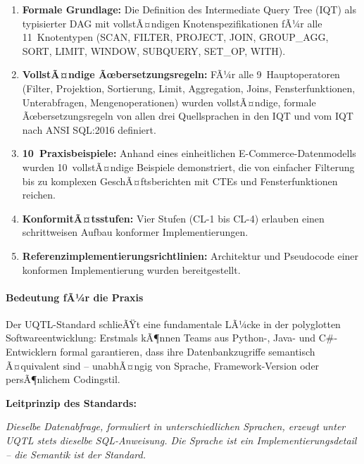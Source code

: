 \begin{enumerate}[leftmargin=1.5cm]
  \item \textbf{Formale Grundlage:} Die Definition des Intermediate Query Tree
    (IQT) als typisierter DAG mit vollstÃ¤ndigen Knotenspezifikationen fÃ¼r alle
    11~Knotentypen (SCAN, FILTER, PROJECT, JOIN, GROUP\_AGG, SORT, LIMIT,
    WINDOW, SUBQUERY, SET\_OP, WITH).

  \item \textbf{VollstÃ¤ndige Ãœbersetzungsregeln:} FÃ¼r alle 9~Hauptoperatoren
    (Filter, Projektion, Sortierung, Limit, Aggregation, Joins, Fensterfunktionen,
    Unterabfragen, Mengenoperationen) wurden vollstÃ¤ndige, formale
    Ãœbersetzungsregeln von allen drei Quellsprachen in den IQT und vom IQT
    nach ANSI SQL:2016 definiert.

  \item \textbf{10~Praxisbeispiele:} Anhand eines einheitlichen E-Commerce-Daten\-modells
    wurden 10~vollstÃ¤ndige Beispiele demonstriert, die von einfacher Filterung bis
    zu komplexen GeschÃ¤ftsberichten mit CTEs und Fensterfunktionen reichen.

  \item \textbf{KonformitÃ¤tsstufen:} Vier Stufen (CL-1 bis CL-4) erlauben
    einen schrittweisen Aufbau konformer Implementierungen.

  \item \textbf{Referenzimplementierungsrichtlinien:} Architektur und
    Pseudocode einer konformen Implementierung wurden bereitgestellt.
\end{enumerate}

\paragraph{Bedeutung fÃ¼r die Praxis}

Der UQTL-Standard schlieÃŸt eine fundamentale LÃ¼cke in der polyglotten
Softwareentwicklung: Erstmals kÃ¶nnen Teams aus Python-, Java- und
C\#-Entwicklern formal garantieren, dass ihre Datenbankzugriffe semantisch
Ã¤quivalent sind -- unabhÃ¤ngig von Sprache, Framework-Version oder persÃ¶nlichem
Codingstil.

\begin{successbox}
\textbf{Leitprinzip des Standards:}

\emph{Dieselbe Datenabfrage, formuliert in unterschiedlichen Sprachen,
erzeugt unter UQTL stets dieselbe SQL-Anweisung. Die Sprache ist ein
Implementierungsdetail -- die Semantik ist der Standard.}
\end{successbox}

